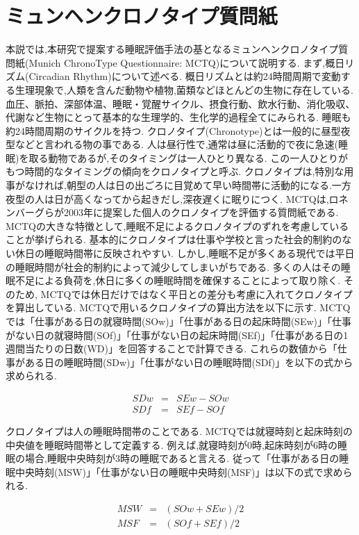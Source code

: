 \section{ミュンヘンクロノタイプ質問紙}
本説では,本研究で提案する睡眠評価手法の基となるミュンヘンクロノタイプ質問紙(Munich ChronoType Questionnaire: MCTQ)について説明する.
まず,概日リズム(Circadian Rhythm)について述べる.
概日リズムとは約24時間周期で変動する生理現象で,人類を含んだ動物や植物,菌類などほとんどの生物に存在している.
血圧、脈拍、深部体温、睡眠・覚醒サイクル、摂食行動、飲水行動、消化吸収、代謝など生物にとって基本的な生理学的、生化学的過程全てにみられる.
睡眠も約24時間周期のサイクルを持つ.
クロノタイプ(Chronotype)とは一般的に昼型夜型などと言われる物の事である.
人は昼行性で,通常は昼に活動的で夜に急速(睡眠)を取る動物であるが,そのタイミングは一人ひとり異なる.
この一人ひとりがもつ時間的なタイミングの傾向をクロノタイプと呼ぶ.
クロノタイプは,特別な用事がなければ,朝型の人は日の出ごろに目覚めて早い時間帯に活動的になる.一方夜型の人は日が高くなってから起きだし,深夜遅くに眠りにつく.
MCTQは,ロネンバーグらが2003年に提案した個人のクロノタイプを評価する質問紙である.
MCTQの大きな特徴として,睡眠不足によるクロノタイプのずれを考慮していることが挙げられる.
基本的にクロノタイプは仕事や学校と言った社会的制約のない休日の睡眠時間帯に反映されやすい.
しかし,睡眠不足が多くある現代では平日の睡眠時間が社会的制約によって減少してしまいがちである.
多くの人はその睡眠不足による負荷を,休日に多くの睡眠時間を確保することによって取り除く.
そのため, MCTQでは休日だけではなく平日との差分も考慮に入れてクロノタイプを算出している.
MCTQで用いるクロノタイプの算出方法を以下に示す.
MCTQでは「仕事がある日の就寝時間(SOw)」「仕事がある日の起床時間(SEw)」「仕事がない日の就寝時間(SOf)」「仕事がない日の起床時間(SEf)」「仕事がある日の1週間当たりの日数(WD)」を回答することで計算できる.
これらの数値から「仕事がある日の睡眠時間(SDw)」「仕事がない日の睡眠時間(SDf)」を以下の式から求められる.

\begin{eqnarray}
	SDw & = & SEw - SOw \\
	SDf & = & SEf - SOf
\end{eqnarray}

クロノタイプは人の睡眠時間帯のことである.
MCTQでは就寝時刻と起床時刻の中央値を睡眠時間帯として定義する.
例えば,就寝時刻が0時,起床時刻が6時の睡眠の場合,睡眠中央時刻が3時の睡眠であると言える.
従って「仕事がある日の睡眠中央時刻(MSW)」「仕事がない日の睡眠中央時刻(MSF)」は以下の式で求められる.

\begin{eqnarray}
	MSW & = & (SOw + SEw) / 2 \\
	MSF & = & (SOf + SEf) / 2
\end{eqnarray}

